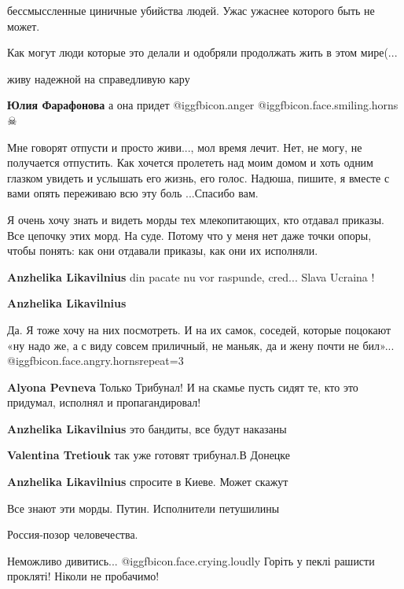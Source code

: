 \begin{itemize}
бессмыссленные циничные убийства людей. Ужас ужаснее которого быть не может.

Как могут люди которые это делали и одобряли продолжать жить в этом мире(...

живу надежной на справедливую кару

\textbf{Юлия Фарафонова} а она придет @igg{fbicon.anger}  @igg{fbicon.face.smiling.horns} ☠


Мне говорят отпусти и просто живи..., мол время лечит. Нет, не могу, не
получается отпустить. Как хочется пролететь над моим домом и хоть одним глазком
увидеть и услышать его жизнь, его голос. Надюша, пишите, я вместе с вами опять
переживаю всю эту боль ...Спасибо вам.


Я очень хочу знать и видеть морды тех млекопитающих, кто отдавал приказы. Все
цепочку этих морд. На суде. Потому что у меня нет даже точки опоры, чтобы
понять: как они отдавали приказы, как они их исполняли.

\begin{itemize} %
\textbf{Anzhelika Likavilnius} din pacate nu vor raspunde, cred... Slava Ucraina !

\textbf{Anzhelika Likavilnius} 

Да. Я тоже хочу на них посмотреть. И на их самок, соседей, которые поцокают «ну
надо же, а с виду совсем приличный, не маньяк, да и жену почти не бил»...  @igg{fbicon.face.angry.horns}{repeat=3} 

\textbf{Alyona Pevneva} Только Трибунал! И на скамье пусть сидят те, кто это придумал, исполнял и пропагандировал!

\textbf{Anzhelika Likavilnius} это бандиты, все будут наказаны

\textbf{Valentina Tretiouk} так уже готовят трибунал.В Донецке

\textbf{Anzhelika Likavilnius} спросите в Киеве. Может скажут

Все знают эти морды. Путин. Исполнители петушилины
\end{itemize} %

Россия-позор человечества.

Неможливо дивитись... @igg{fbicon.face.crying.loudly}  Горіть у пеклі рашисти прокляті! Ніколи не пробачимо!


\end{itemize}
